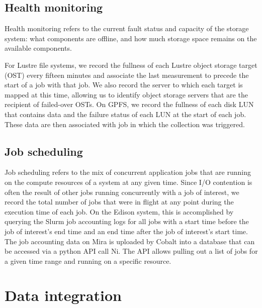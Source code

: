 \subsection{Health monitoring }
\label{sec:methods/health}

Health monitoring refers to the current fault status and capacity of the
storage system: what components are offline, and how much storage space
remains on the available components.

For Lustre file systems, we record the fullness of each Lustre object storage target (OST) every fifteen minutes and associate the last measurement to precede the start of a job with that job.
We also record the server to which each target is mapped at this time, allowing us to identify object storage servers that are the recipient of failed-over OSTs.
On GPFS, we record the fullness of each disk LUN that contains data and the failure status of each LUN at the start of each job.
These data are then associated with job in which the collection was triggered.

\subsection{Job scheduling }

Job scheduling refers to the mix of concurrent application jobs that are running on the compute resources of a system at any given time.
Since I/O contention is often the result of other jobs running concurrently with a job of interest, we record the total number of jobs that were in flight at any point during the execution time of each job.
On the Edison system, this is accomplished by querying the Slurm job accounting logs for all jobs with a start time before the job of interest's end time and an end time after the job of interest's start time.
The job accounting data on Mira is uploaded by Cobalt into a database that can
be accessed via a python API call Ni. The API allows pulling out a list of
jobs for a given time range and running on a specific resource.

\section{Data integration}

